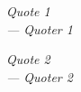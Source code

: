 \thispagestyle{empty}
\mbox{}
\begin{flushright}

{\selectfont
  \vspace{6cm}

  \it{
  Quote 1
  }
  \\
  --- \textit{Quoter 1}

  \vspace{3cm}

  \it{
  Quote 2
  }
  \\
  --- \textit{Quoter 2}
}

\end{flushright}


